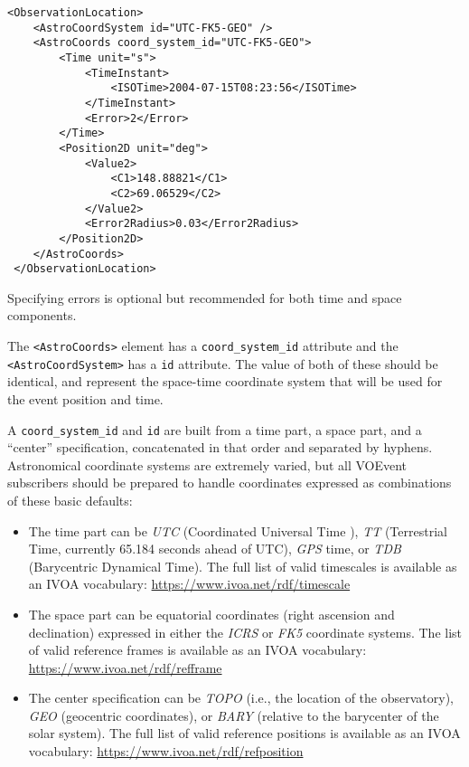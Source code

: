\documentclass[11pt,a4paper]{ivoa}
\begin{document}
\begin{lstlisting}
<ObservationLocation>
    <AstroCoordSystem id="UTC-FK5-GEO" />
    <AstroCoords coord_system_id="UTC-FK5-GEO">
        <Time unit="s">
            <TimeInstant>
                <ISOTime>2004-07-15T08:23:56</ISOTime>
            </TimeInstant>
            <Error>2</Error>
        </Time>
        <Position2D unit="deg">
            <Value2>
                <C1>148.88821</C1>
                <C2>69.06529</C2>
            </Value2>
            <Error2Radius>0.03</Error2Radius>
        </Position2D>
    </AstroCoords>
 </ObservationLocation>
\end{lstlisting}

Specifying errors is optional but recommended for both time and space
components.

The {\tt <AstroCoords>} element has a {\tt coord\_system\_id} attribute and the
{\tt <AstroCoordSystem>} has a {\tt id} attribute. The value of both of these
should be identical, and represent the space-time coordinate system that will be
used for the event position and time.

A {\tt coord\_system\_id} and {\tt id} are built from a time part, a space part,
and a ``center'' specification, concatenated in that order and separated by
hyphens. Astronomical coordinate systems are extremely varied, but all VOEvent
subscribers should be prepared to handle coordinates expressed as combinations
of these basic defaults:
\begin{itemize}
\item The time part can be \emph{UTC} (Coordinated Universal Time
\citep{bib26}), \emph{TT} (Terrestrial Time, currently 65.184 seconds ahead of
UTC), \emph{GPS} time, or \emph{TDB} (Barycentric Dynamical Time). The full list
of valid timescales is available as an IVOA vocabulary:
\url{https://www.ivoa.net/rdf/timescale}
\item The space part can be equatorial coordinates (right ascension and
declination) expressed in either the \emph{ICRS} or \emph{FK5} coordinate
systems. The list of valid reference frames is available as an IVOA vocabulary:
\url{https://www.ivoa.net/rdf/refframe}
\item The center specification can be \emph{TOPO} (i.e., the location of the
observatory), \emph{GEO} (geocentric coordinates), or \emph{BARY} (relative to
the barycenter of the solar system). The full list of valid reference positions
is available as an IVOA vocabulary: \url{https://www.ivoa.net/rdf/refposition}
\end{itemize}
\end{document}
